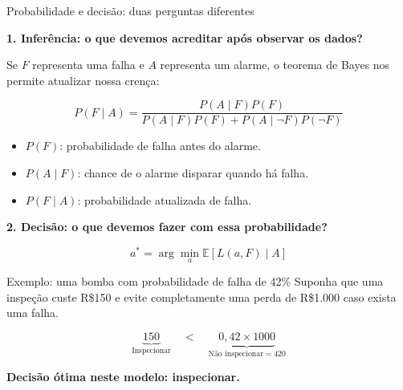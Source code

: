 \documentclass[aspectratio=169,11pt]{beamer}
\begin{document}

\begin{frame}[allowframebreaks]{Probabilidade e decisão: duas perguntas diferentes}

\textbf{1. Inferência: o que devemos acreditar após observar os dados?}

\vspace{0.15cm}

Se $F$ representa uma falha e $A$ representa um alarme,
o teorema de Bayes nos permite atualizar nossa crença:

\[
\boxed{
P(F\mid A)
=
\frac{P(A\mid F)P(F)}
{P(A\mid F)P(F)+P(A\mid \neg F)P(\neg F)}
}
\]

\begin{itemize}
    \item $P(F)$: probabilidade de falha antes do alarme.
    \item $P(A\mid F)$: chance de o alarme disparar quando há falha.
    \item $P(F\mid A)$: probabilidade atualizada de falha.
\end{itemize}

\vspace{0.15cm}

\textbf{2. Decisão: o que devemos fazer com essa probabilidade?}

\[
\boxed{
a^*
=
\arg\min_{a}
\mathbb{E}[L(a,F)\mid A]
}
\]

\begin{exampleblock}{Exemplo: uma bomba com probabilidade de falha de 42\%}
Suponha que uma inspeção custe R\$150 e evite completamente
uma perda de R\$1.000 caso exista uma falha.

\[
\underbrace{150}_{\text{Inspecionar}}
\quad < \quad
\underbrace{0{,}42\times 1000}_{\text{Não inspecionar} = 420}
\]

\centering
\textbf{Decisão ótima neste modelo: inspecionar.}
\end{exampleblock}

\end{frame}


\end{document}
